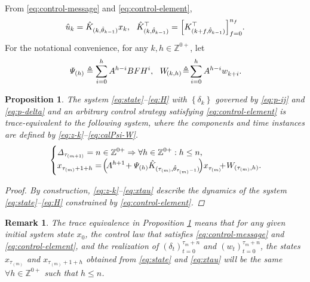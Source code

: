 \documentclass[letterpaper, 10 pt, conference]{ieeeconf}  %
\newtheorem{remark}{Remark}
\newtheorem{proposition}{Proposition}
\begin{document}
From \eqref{eq:control-message} and \eqref{eq:control-element}, 
\begin{equation}\label{eq:control-gains-matrix}
    \text{\small $\hat{u}_{k} = \hat{K}_{(k,\hat{\theta}_{k-1})} x_k,~~
    \hat{K}_{(k,\hat{\theta}_{k-1})}^{\top} = \left[K_{(k+f,\hat{\theta}_{k-1})}^{\top}\right]_{f=0}^{n_f}$}.
\end{equation}
For the notational convenience, for any $k,h\in\mathbb{Z}^{0+}$, let
\begin{equation}\label{eq:calPsi-W}
\text{\small $\mathit{\Psi}_{(h)} \triangleq \sum_{i=0}^{h}A^{h-i}BFH^{i},~~
W_{\!(k,h)} \!\triangleq\! \sum_{i=0}^{h}A^{h-i} w_{k+i}^{}$}.
\end{equation}

\begin{proposition}\label{prop:equiv}
    The system \eqref{eq:state}--\eqref{eq:H} 
    with $\left\{\delta_{k}\right\}$ governed by \eqref{eq:p-ij} and \eqref{eq:p-delta} and an arbitrary control strategy satisfying %
    \eqref{eq:control-element} is trace-equivalent to the following system, where the components and time instances are defined by \eqref{eq:z-k}--\eqref{eq:calPsi-W}.
    \begin{equation}\label{eq:xtau}
    \text{\small $
    \begin{cases}
        \mathit{\Delta}_{\tau_{(m+1)}} = n \in \mathbb{Z}^{0+}  \Rightarrow  \forall h \in \mathbb{Z}^{0+} : h \leq n, \\
         x_{\tau_{(m)}+1+h}^{} =\! \Big(\!A^{h+1} \!+\! \mathit{\Psi}_{(h)}\hat{K}_{(\tau_{(m)},\hat{\theta}_{\tau_{(m)}-1})}\!\Big)x_{\tau_{(m)}}^{} \!\!\!+\! W_{(\tau_{(m)},h)}.\!\!\!\!\!\!\!
    \end{cases}$}
    \end{equation}
    \begin{proof}
        By construction, \eqref{eq:z-k}--\eqref{eq:xtau} describe the dynamics of the system \eqref{eq:state}--\eqref{eq:H} constrained by %
        \eqref{eq:control-element}.
    \end{proof}
\end{proposition}
\begin{remark}\label{rem:trace-equivalence}
The trace equivalence in Proposition \ref{prop:equiv} means that for any given initial system state $x_{0}$, the control law that satisfies \eqref{eq:control-message} and \eqref{eq:control-element}, and the realization of $\left(\delta_{t}\right)_{t=0}^{\tau_{m}+n}$ and $\left(w_{t}\right)_{t=0}^{\tau_{m}+n}$, the states $x_{\tau_{(m)}}$ and $x_{\tau_{(m)}+1+h}$ obtained from \eqref{eq:state} and \eqref{eq:xtau} will be the same $\forall h\in \mathbb{Z}^{0+}$ such that $h\leq n$. 
\end{remark}
\end{document}
